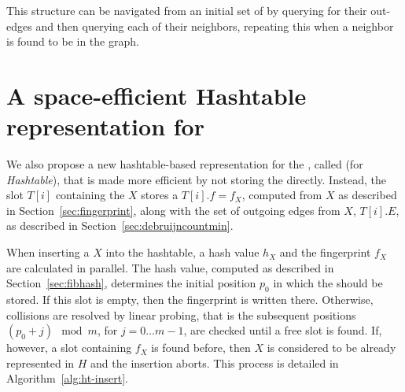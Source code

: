  This structure can be navigated from
an initial set of \kmers by querying for their out-edges and then querying each of their neighbors, repeating this when a neighbor is
found to be in the graph. 


\section{A space-efficient Hashtable representation for }
\label{sec:debruijnhashtable}

We also propose a new hashtable-based representation for the \dBG, called \dBHT (for \emph{\dB Hashtable}), that is made more efficient by not storing the \kmer directly. Instead, the slot $T[i]$ containing the \kmer $X$ stores a  $T[i].f = f_X$, computed from $X$ as described in Section~\ref{sec:fingerprint}, along with the set of outgoing edges from $X$, $T[i].E$,  as described in Section~\ref{sec:debruijncountmin}.

When inserting a \kmer $X$ into the hashtable, a hash value $h_X$ and the fingerprint $f_X$ are calculated in parallel. The hash value, computed as described in Section~\ref{sec:fibhash}, determines the initial position $p_0$ in which the \kmer should be stored. If this slot is empty, then the fingerprint is written there. Otherwise, collisions are resolved by linear probing, that is the subsequent positions $(p_0+j)\mod m$, for $j=0\ldots m-1$, are checked until a free slot is found. If, however, a slot containing $f_X$ is found before, then $X$ is considered to be already represented in $H$ and the insertion aborts. This process is detailed in Algorithm~\ref{alg:ht-insert}. 


